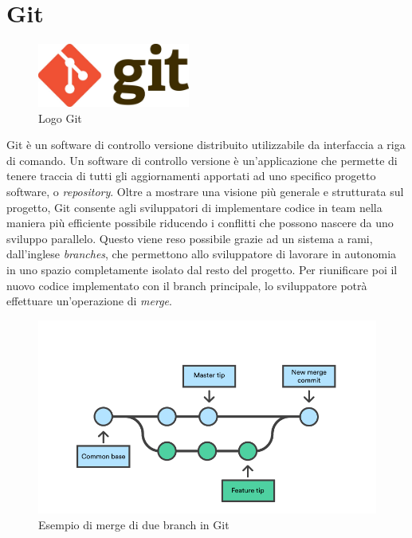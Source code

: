 \section{Git}
\begin{figure}[ht!]
\begin{center}
  \includegraphics[width=5cm]{images/git_logo.jpg}
  \caption{Logo Git}
\end{center}
\end{figure}
Git è un software di controllo versione distribuito utilizzabile da interfaccia a riga di comando. \cite{GIT}
Un software di controllo versione è un'applicazione che permette di tenere traccia di tutti gli aggiornamenti apportati ad uno specifico progetto software, o \textit{repository}.
Oltre a mostrare una visione più generale e strutturata sul progetto, Git consente agli sviluppatori di implementare codice in team nella maniera più efficiente possibile riducendo i conflitti che possono nascere da uno sviluppo parallelo. Questo viene reso possibile grazie ad un sistema a rami, dall'inglese \textit{branches}, che permettono allo sviluppatore di lavorare in autonomia in uno spazio completamente isolato dal resto del progetto. Per riunificare poi il nuovo codice implementato con il branch principale, lo sviluppatore potrà effettuare un'operazione di \textit{merge}.
\begin{figure}[ht!]
\begin{center}
  \includegraphics[width=12cm]{images/merge-di-due-branch.png}
  \caption{Esempio di merge di due branch in Git}
\end{center}
\end{figure}

